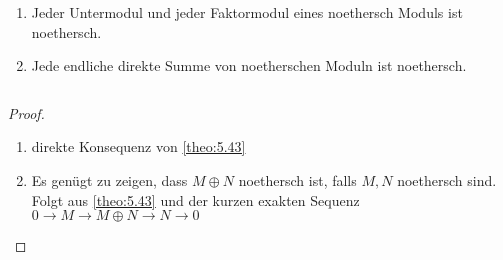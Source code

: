 \documentclass[../main.tex]{subfiles}
\begin{document}
\begin{corollary}\label{theo:5.44} $ $
    \begin{enumerate}[label=(\roman*)]
        \item Jeder Untermodul und jeder Faktormodul eines noethersch Moduls ist noethersch.
        \item Jede endliche direkte Summe von noetherschen Moduln ist noethersch.
    \end{enumerate}
\end{corollary} $ $
\begin{proof}$ $
    \begin{enumerate}[label=(\roman*)]
        \item direkte Konsequenz von \ref{theo:5.43}
        \item Es genügt zu zeigen, dass $M\oplus N$ noethersch ist, falls $M,N$ noethersch sind. Folgt aus \ref{theo:5.43} und der kurzen exakten Sequenz $0\rightarrow M \rightarrow M\oplus N \rightarrow N \rightarrow 0$
    \end{enumerate}
\end{proof}
\end{document}
